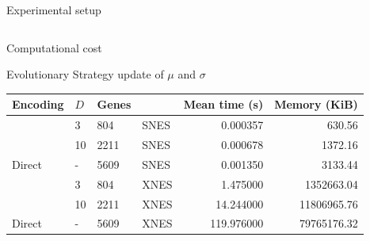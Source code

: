 \begin{frame}{\tciii{} Experimental setup}
\begin{columns}
    \end{columns}
\end{frame}


\begin{frame}{\tciii{} Computational cost}
    
    \begin{block}{Evolutionary Strategy update of $\mu$ and $\sigma$} 
            \begin{table}
                \begin{tabular}{llllrr}
                        Encoding  & $D$ & Genes &  &  Mean time (s) &  Memory (KiB) \\
                    \midrule
                    \pltwogene{} &   3 & 804 & SNES &       0.000357 &                 630.56 \\
                    \pltwogene{} &  10 & 2211 & SNES &       0.000678 &                1372.16 \\
                     Direct &   - & 5609 & SNES &       0.001350 &                3133.44 \\
                    \pltwogene{} &   3 & 804 & XNES &       1.475000 &             1352663.04 \\
                    \pltwogene{} &  10 & 2211 & XNES &      14.244000 &            11806965.76 \\
                     Direct &   - & 5609 & XNES &     119.976000 &            79765176.32 \\
                    \end{tabular}
            \end{table}
        \end{block}
    \end{frame}



